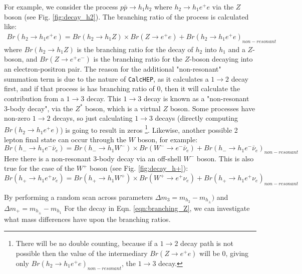 \documentclass[12pt]{article}
\begin{document}
For example, we consider the process $p\bar{p} \rightarrow h_1h_2$ where $ h_2\rightarrow h_1 e^+e$ via the $Z$ boson (see Fig. \ref{fig:decay_h2}). The branching ratio of the process is calculated like:
\begin{equation}
    \begin{split}
        Br(h_2 \rightarrow h_1 e^+e) = Br(h_2\rightarrow h_1Z) \times Br(Z\rightarrow e^+e) + Br(h_2 \rightarrow h_1 e^+e)_{non-resonant}
        \label{eqn:branching_Z}
    \end{split}
\end{equation}
where \( Br(h_2 \rightarrow h_1 Z) \) is the branching ratio for the decay of \( h_2 \) into \( h_1 \) and a \( Z \)-boson, and \( Br(Z \rightarrow e^+ e^-) \) is the branching ratio for the \( Z \)-boson decaying into an electron-positron pair. The reason for the additional "non-resonant" summation term is due to the nature of \verb|CalcHEP|, as it calculates a $1\rightarrow2$ decay first, and if that process is has branching ratio of $0$, then it will calculate the contribution from a $1\rightarrow3$ decay.  This  $1\rightarrow3$ decay is known as a "non-resonant 3-body decay", via the $Z^*$ boson, which is a virtual $Z$ boson. Some processes have non-zero $1\rightarrow2$ decays, so just calculating $1\rightarrow3$ decays (directly computing $Br(h_2 \rightarrow h_1 e^+e)$) is going to result in zeros \footnote{There will be no double counting, because if a $1\rightarrow2$ decay path is not possible then the value of the intermediary $Br(Z\rightarrow e^+e)$ will be $0$, giving only $Br(h_2 \rightarrow h_1 e^+e)_{non-resonant}$, the $1\rightarrow3$ decay.}. Likewise, another possible 2 lepton final state can occur through the $W$ boson, for example:
\begin{equation}
    Br(h_-\rightarrow h_1e^- \bar{\nu}_e) = Br(h_-\rightarrow h_1 W^-) \times Br(W^- \rightarrow e^- \bar{\nu}_e) + Br(h_-\rightarrow h_1e^- \bar{\nu}_e)_{non-resonant}
\end{equation}
Here there is a non-resonant 3-body decay via an off-shell ${W^-}$ boson. This is also true for the case of the $W^+$ boson (see Fig. \ref{fig:decay_h+}):
\begin{equation}
    Br(h_+\rightarrow h_1e^+ \nu_e) = Br(h_+\rightarrow h_1 W^+) \times Br(W^+ \rightarrow e^+ \nu_e) + Br(h_+\rightarrow h_1e^+ \nu_e)_{non-resonant}
\end{equation}

By performing a random scan across parameters $\Delta m_3 = m_{h_2} - m_{h_\pm})$ and $\Delta m_+ = m_{h_\pm} - m_{h_1}$ For the decay in Eqn. \ref{eqn:branching_Z}, we can investigate what mass differences have upon the branching ratios.
\end{document}
